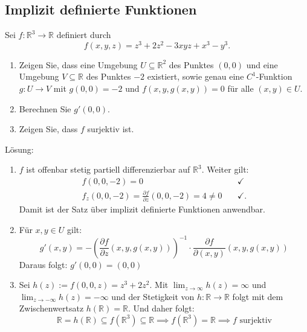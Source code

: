 \subsection{Implizit definierte Funktionen}
Sei $f : \mathbb{R}^3 \to \mathbb{R}$ definiert durch
\begin{displaymath}
  f(x,y,z) = z^3 + 2z^2 - 3xyz + x^3 - y^3.
\end{displaymath}
\begin{enumerate}
    \item Zeigen Sie, dass eine Umgebung $U \subseteq \mathbb{R}^2$ des Punktes $(0,0)$ und eine Umgebung $V \subseteq \mathbb{R}$ des Punktes $-2$ existiert, sowie genau eine $C^1$-Funktion $g : U \to V$ mit $g(0,0) = -2$ und $f(x,y,g(x,y)) = 0$ für alle $(x,y) \in U$.
    \item Berechnen Sie $g'(0,0)$.
    \item Zeigen Sie, dass $f$ surjektiv ist.
\end{enumerate}
Lösung:
\begin{enumerate}
    \item $f$ ist offenbar stetig partiell differenzierbar auf $\mathbb{R}^3$.
    Weiter gilt:
    \begin{align*}
      f(0,0,-2) = 0 &\quad \checkmark\\
      f_z(0,0,-2) = \frac{\partial f}{\partial z} (0,0,-2) = 4 \neq 0 &\quad \checkmark.
    \end{align*}
    Damit ist der Satz über implizit definierte Funktionen anwendbar.
    \item Für $x,y \in U$ gilt:
    \begin{displaymath}
      g'(x,y) = -\left(\frac{\partial f}{\partial z} (x,y,g(x,y))\right)^{-1} \cdot \frac{\partial f}{\partial (x,y)} (x,y,g(x,y))
    \end{displaymath}
    Daraus folgt: $g'(0,0) = (0,0)$
    \item Sei $h(z) := f(0,0,z) = z^3 + 2z^2$. Mit $\lim_{z \to \infty} h(z) = \infty$ und $\lim_{z \to -\infty} h(z) = -\infty$ und der Stetigkeit von $h : \mathbb{R} \to \mathbb{R}$ folgt mit dem Zwischenwertsatz $h(\mathbb{R}) = \mathbb{R}$.
    Und daher folgt:
    \begin{displaymath}
      \mathbb{R} = h(\mathbb{R}) \subseteq f(\mathbb{R}^3) \subseteq \mathbb{R} \implies f(\mathbb{R}^3) = \mathbb{R} \implies f \text{ surjektiv}
    \end{displaymath}
\end{enumerate}

